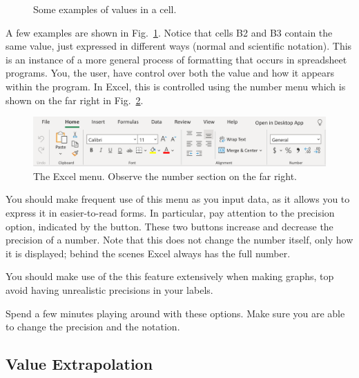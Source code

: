\documentclass[10pt]{article}
\begin{document}
\begin{figure}[htpb]
	\centering
	\begin{sheetpic}
	\end{sheetpic}
	\caption{Some examples of values in a cell. }%
	\label{fig:valsincells}
\end{figure}

A few examples are shown in Fig.~\ref{fig:valsincells}. Notice that cells B2 and B3 contain the same value, just expressed in different ways (normal and scientific notation). This is an instance of a more general process of formatting that occurs in spreadsheet programs. You, the user, have control over both the value and how it appears within the program. In Excel, this is controlled using the number menu which is shown on the far right in Fig.~\ref{fig:images_Menu}.

\begin{figure}[htpb]
	\centering
	\includegraphics[width=0.8\linewidth]{images/Menu.png}
	\caption{The Excel menu. Observe the number section on the far right. }%
	\label{fig:images_Menu}
\end{figure}

You should make frequent use of this menu as you input data, as it allows you to express it in easier-to-read forms. In particular, pay attention to the precision option, indicated by the  button. These two buttons increase and decrease the precision of a number. Note that this does not change the number itself, only how it is displayed; behind the scenes Excel always has the full number. 

You should make use of the this feature extensively when making graphs, top avoid having unrealistic precisions in your labels. 

Spend a few minutes playing around with these options. Make sure you are able to change the precision and the notation. 

\subsection{Value Extrapolation}%
\label{sub:value_extrapolation}
\end{document}
